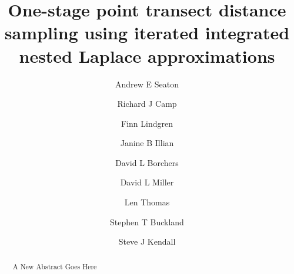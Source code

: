\documentclass[preprint,12pt]{elsarticle}
\newcommand{\hawaii}{Hawai\textquotesingle i}   %
\begin{document}
\begin{frontmatter}
\title{One-stage point transect distance sampling using iterated integrated nested Laplace approximations}




\author[1,*]{Andrew E Seaton}
\author[1,2]{Richard J Camp}
\author[3]{Finn Lindgren}
\author[1]{Janine B Illian}
\author[1]{David L Borchers}
\author[1]{David L Miller}      %
\author[1]{Len Thomas}          %
\author[1]{Stephen T Buckland}  %
\author[4]{Steve J Kendall}     %

\address[1]{Centre for Research into Ecological \& Environmental Modelling and School of Mathematics \& Statistics, University of St Andrews, St Andrews, Fife, Scotland}
\address[2]{U. S. Geological Survey, Pacific Island Ecosystems Research Center, P.O. Box 44, \hawaii{} National Park, HI 96718, U.S.A.}
\address[3]{School of Mathematics, University of Edinburgh, Edinburgh, Scotland}
\address[4]{U. S. Fish and Wildlife, Big Island National Wildlife Refuge Complex, 60 Nowelo St., Suite 100, Hilo, HI  96720, U.S.A.}
\address[*]{Correspondence: Andrew E Seaton, Email: aes22@st-andrews.ac.uk}

\begin{abstract}
A New Abstract Goes Here   
\end{abstract}

\end{frontmatter}
\end{document}
